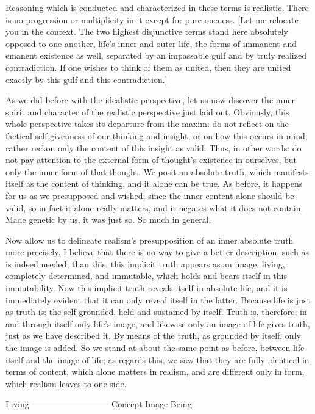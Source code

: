 Reasoning which is conducted and characterized
in these terms is realistic.
There is no progression or multiplicity
in it except for pure oneness.
[Let me relocate you in the context.
The two highest disjunctive terms stand
here absolutely opposed to one another,
life's inner and outer life,
the forms of immanent and emanent existence as well,
separated by an impassable gulf
and by truly realized contradiction.
If one wishes to think of them as united,
then they are united exactly
by this gulf and this contradiction.]

As we did before with the idealistic perspective,
let us now discover the inner spirit and character
of the realistic perspective just laid out.
Obviously, this whole perspective takes
its departure from the maxim:
do not reflect on the factical self-givenness
of our thinking and insight,
or on how this occurs in mind,
rather reckon only the content of this insight as valid.
Thus, in other words:
do not pay attention to the external form
of thought's existence in ourselves,
but only the inner form of that thought.
We posit an absolute truth,
which manifests itself as the content of thinking,
and it alone can be true.
As before, it happens for us as we presupposed and wished;
since the inner content alone should be valid,
so in fact it alone really matters,
and it negates what it does not contain.
Made genetic by us, it was just so.
So much in general.

Now allow us to delineate realism's presupposition
of an inner absolute truth more precisely.
I believe that there is no way to give a better description,
such as is indeed needed, than this:
this implicit truth appears as an image,
living, completely determined, and immutable,
which holds and bears itself in this immutability.
Now this implicit truth reveals itself in absolute life,
and it is immediately evident that it can only
reveal itself in the latter.
Because life is just as truth is:
the self-grounded, held and sustained by itself.
Truth is, therefore, in and through itself only life's image,
and likewise only an image of life gives truth,
just as we have described it.
By means of the truth, as grounded by itself,
only the image is added.
So we stand at about the
same point as before,
between life itself and the image of life;
as regards this, we saw that they are
fully identical in terms of content,
which alone matters in realism,
and are different only in form,
which realism leaves to one side.

Living
—————————
Concept Image Being

